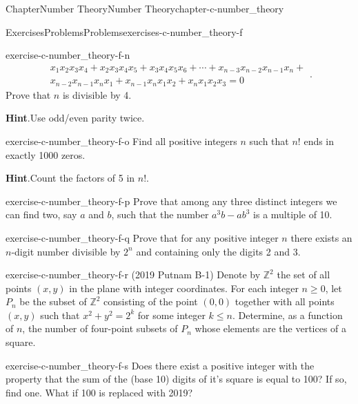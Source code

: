 \documentclass[oneside,10pt,]{book}
\newcommand{\blocktitlefont}{\relax}
\numberwithin{equation}{section}
\begin{document}
\begin{chapterptx}{Chapter}{Number Theory}{}{Number Theory}{}{}{chapter-c-number_theory}
\begin{exercises-section}{Exercises}{Problems}{}{Problems}{}{}{exercises-c-number_theory-f}
\begin{divisionexercise}{12}{}{}{exercise-c-number_theory-f-n}
\begin{equation*}
\begin{split}
x_1x_2x_3x_4+x_2x_3x_4x_5+x_3x_4x_5x_6+\cdots+x_{n-3}x_{n-2}x_{n-1}x_n+\\
x_{n-2}x_{n-1}x_nx_1+x_{n-1}x_nx_1x_2+x_nx_1x_2x_3=0
\end{split}\text{.}
\end{equation*}
Prove that \(n\) is divisible by 4.%
\par\smallskip%
\noindent\textbf{\blocktitlefont Hint}.\hypertarget{hint-c-number_theory-f-n-b}{}\quad{}Use odd\slash{}even parity twice.%
\end{divisionexercise}%
\begin{divisionexercise}{13}{}{}{exercise-c-number_theory-f-o}%
Find all positive integers \(n\) such that \(n!\) ends in exactly 1000 zeros.%
\par\smallskip%
\noindent\textbf{\blocktitlefont Hint}.\hypertarget{hint-c-number_theory-f-o-b}{}\quad{}Count the factors of 5 in \(n!\).%
\end{divisionexercise}%
\begin{divisionexercise}{14}{}{}{exercise-c-number_theory-f-p}%
Prove that among any three distinct integers we can find two, say \(a\) and \(b\), such that the number \(a^3b - a b^3\) is a multiple of 10.%
\end{divisionexercise}%
\begin{divisionexercise}{15}{}{}{exercise-c-number_theory-f-q}%
%
Prove that for any positive integer \(n\) there exists an \(n\)-digit number divisible by \(2^n\) and containing only the digits 2 and 3.%
\end{divisionexercise}%
\begin{divisionexercise}{16}{}{}{exercise-c-number_theory-f-r}%
(2019 Putnam B-1) Denote by \(\mathbb{Z}^2\) the set of all points \((x,y)\) in the plane with integer coordinates. For each integer \(n \geq 0\), let \(P_n\) be the subset of \(\mathbb{Z}^2\) consisting of the point \((0,0)\) together with all points \((x,y)\) such that \(x^2 + y^2 = 2^k\) for some integer \(k \leq n\). Determine, as a function of \(n\), the number of four-point subsets of \(P_n\) whose elements are the vertices of a square.%
\end{divisionexercise}%
\begin{divisionexercise}{17}{}{}{exercise-c-number_theory-f-s}%
Does there exist a positive integer with the property that the sum of the (base 10) digits of it’s square is equal to 100?  If so, find one. What if 100 is replaced with 2019?%

\end{divisionexercise}
\end{exercises-section}
\end{chapterptx}
\end{document}
